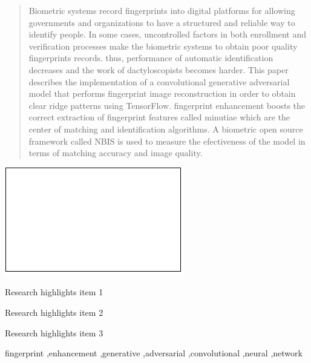 \documentclass[a4paper,fleqn]{cas-dc}
\begin{document}
\begin{abstract}
Biometric systems record fingerprints into digital platforms for allowing governments and organizations to have a structured and reliable way to identify people. In some cases, uncontrolled factors in both enrollment and verification processes make the biometric systems to obtain poor quality fingerprints records. thus, performance of automatic identification decreases and the work of dactyloscopists becomes harder. This paper describes the implementation of a convolutional generative adversarial model that performs fingerprint image reconstruction in order to obtain clear ridge patterns using TensorFlow. fingerprint enhancement boosts the correct extraction of fingerprint features called minutiae which are the center of matching and identification algorithms. A biometric open source framework called NBIS is used to measure the efectiveness of the model in terms of matching accuracy and image quality.
\end{abstract}

\begin{graphicalabstract}
\includegraphics{figs/grabs.pdf}
\end{graphicalabstract}

\begin{highlights}
\item Research highlights item 1
\item Research highlights item 2
\item Research highlights item 3
\end{highlights}

\begin{keywords}
fingerprint \sep enhancement \sep generative \sep adversarial \sep convolutional \sep neural \sep network
\end{keywords}


\maketitle
\end{document}
